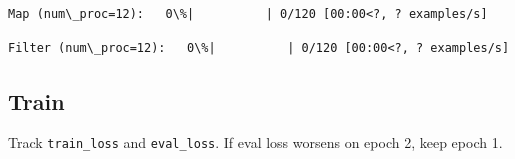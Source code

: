 \documentclass[11pt]{article}
\begin{document}
    
    
    \begin{Verbatim}[commandchars=\\\{\}]
Map (num\_proc=12):   0\%|          | 0/120 [00:00<?, ? examples/s]
    \end{Verbatim}

    
    
    \begin{Verbatim}[commandchars=\\\{\}]
Filter (num\_proc=12):   0\%|          | 0/120 [00:00<?, ? examples/s]
    \end{Verbatim}

    
    \subsection{Train}\label{train}

Track \texttt{train\_loss} and \texttt{eval\_loss}. If eval loss worsens
on epoch 2, keep epoch 1.
\end{document}
